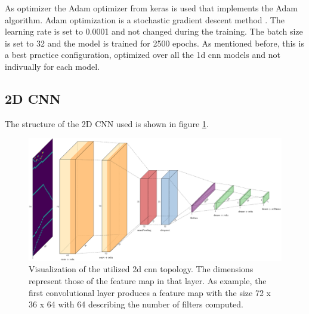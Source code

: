 As optimizer the Adam optimizer from keras is used that implements the Adam algorithm. Adam optimization is a stochastic gradient descent method . The learning rate is set to 0.0001 and not changed during the training. The batch size is set to 32 and the model is trained for 2500 epochs. As mentioned before, this is a best practice configuration, optimized over all the 1d cnn models and not indivually for each model. 

\subsection{2D CNN}
\label{2d_cnn}
The structure of the 2D CNN used is shown in figure \ref{fig:2dCnnStructure}.
\begin{figure}[H]
	\centering
	\includegraphics[width=15cm]{images/2dCnnStructure_new.png}
	\caption[Bild kurz]{Visualization of the utilized 2d cnn topology. The dimensions represent those of the feature map in that layer. As example, the first convolutional layer produces a feature map with the size 72 x 36 x 64 with 64 describing the number of filters computed.}
	\label{fig:2dCnnStructure}
\end{figure}
